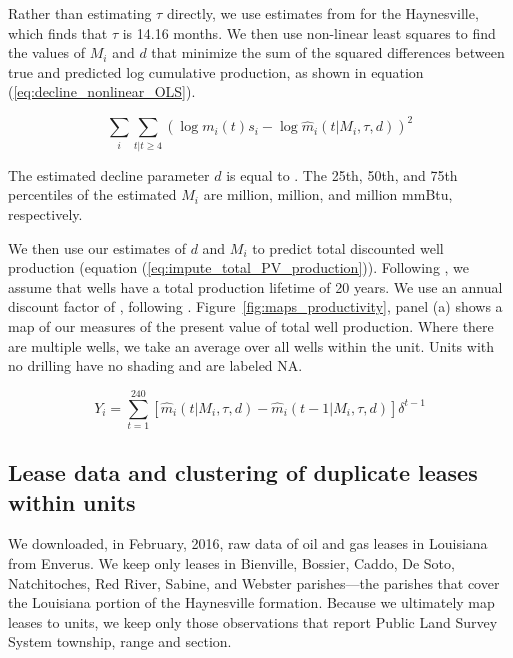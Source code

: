 \documentclass[12pt]{article}
\begin{document}
Rather than estimating $\tau$ directly, we use estimates from \cite{bib:male} for the Haynesville, which finds that $\tau$ is 14.16 months. We then use non-linear least squares to find the values of $M_i$ and $d$ that minimize the sum of the squared differences between true and predicted log cumulative production, as shown in equation (\ref{eq:decline_nonlinear_OLS}).

\begin{equation}
\sum_i  \sum_{t | t \geq 4} \left( \log m_i(t) s_i - \log \widehat{m}_i(t | M_i, \tau, d) \right)^2
\label{eq:decline_nonlinear_OLS}
\end{equation}

The estimated decline parameter $d$ is equal to \unskip. The 25th, 50th, and 75th percentiles of the estimated $M_i$ are \unskip\space million, \unskip\space million, and \unskip\space million mmBtu, respectively.

We then use our estimates of $d$ and $M_i$ to predict total discounted well production (equation (\ref{eq:impute_total_PV_production})). Following \citet{bib:gulen}, we assume that wells have a total production lifetime of 20 years. We use an annual discount factor of \unskip, following \cite{bib:kellogg}. Figure~\ref{fig:maps_productivity}, panel (a) shows a map of our measures of the present value of total well production. Where there are multiple wells, we take an average over all wells within the unit. Units with no drilling have no shading and are labeled NA.

\begin{equation}
Y_i = \sum_{t = 1}^{240} [\widehat{m}_i(t | M_i, \tau, d) - \widehat{m}_i(t-1 | M_i, \tau, d) ] \delta^{t-1}
\label{eq:impute_total_PV_production}
\end{equation}


\subsection{Lease data and clustering of duplicate leases within units} \label{appx:lease_data}

We downloaded, in February, 2016, raw data of oil and gas leases in Louisiana from Enverus. We keep only leases in Bienville, Bossier, Caddo, De Soto, Natchitoches, Red River, Sabine, and Webster parishes---the parishes that cover the Louisiana portion of the Haynesville formation. Because we ultimately map leases to units, we keep only those observations that report Public Land Survey System township, range and section.
\end{document}
